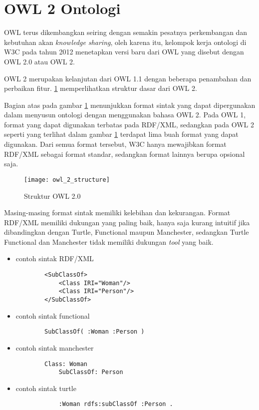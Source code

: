 \section{OWL 2 Ontologi}
OWL terus dikembangkan seiring dengan semakin pesatnya perkembangan dan kebutuhan akan \emph{knowledge sharing}, oleh karena itu, kelompok kerja ontologi di W3C pada tahun 2012 menetapkan versi baru dari OWL yang disebut dengan OWL 2.0 atau OWL 2.

OWL 2 merupakan kelanjutan dari OWL 1.1 dengan beberapa penambahan dan perbaikan fitur. \ref{fig:owl_2_structure} memperlihatkan struktur dasar dari OWL 2.

Bagian atas pada gambar \ref{fig:owl_2_structure} menunjukkan format sintak yang dapat dipergunakan dalam menyusun ontologi dengan menggunakan bahasa OWL 2. Pada OWL 1, format yang dapat digunakan terbatas pada RDF/XML, sedangkan pada OWL 2 seperti yang terlihat dalam gambar \ref{fig:owl_2_structure} terdapat lima buah format yang dapat digunakan. Dari semua format tersebut, W3C hanya mewajibkan format RDF/XML sebagai format standar, sedangkan format lainnya berupa opsional saja.

\begin{figure}[h]
	\centering
	\texttt{[image: owl\_2\_structure]}
	\caption{Struktur OWL 2.0}
	\label{fig:owl_2_structure}
\end{figure}

Masing-masing format sintak memiliki kelebihan dan kekurangan. Format RDF/XML memiliki dukungan yang paling baik, hanya saja kurang intuitif jika dibandingkan dengan Turtle, Functional maupun Manchester, sedangkan Turtle Functional dan Manchester tidak memiliki dukungan \emph{tool} yang baik.
\begin{itemize}
	\item contoh sintak RDF/XML \\
	\begin{lstlisting}
		<SubClassOf>
			<Class IRI="Woman"/>
			<Class IRI="Person"/>
		</SubClassOf>
	\end{lstlisting}

	\item contoh sintak functional \\
	\begin{lstlisting}
		SubClassOf( :Woman :Person )
	\end{lstlisting}
	
	\item contoh sintak manchester
	\begin{lstlisting}
		Class: Woman
			SubClassOf: Person
	\end{lstlisting}

	\item contoh sintak turtle
		\begin{lstlisting}
			:Woman rdfs:subClassOf :Person .
		\end{lstlisting}
\end{itemize}

